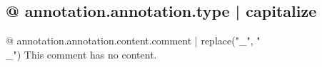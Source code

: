 \subsection{{@ annotation.annotation.type | capitalize }}

{@ annotation.annotation.content.comment | replace("_", "\\_") }
This comment has no content.
